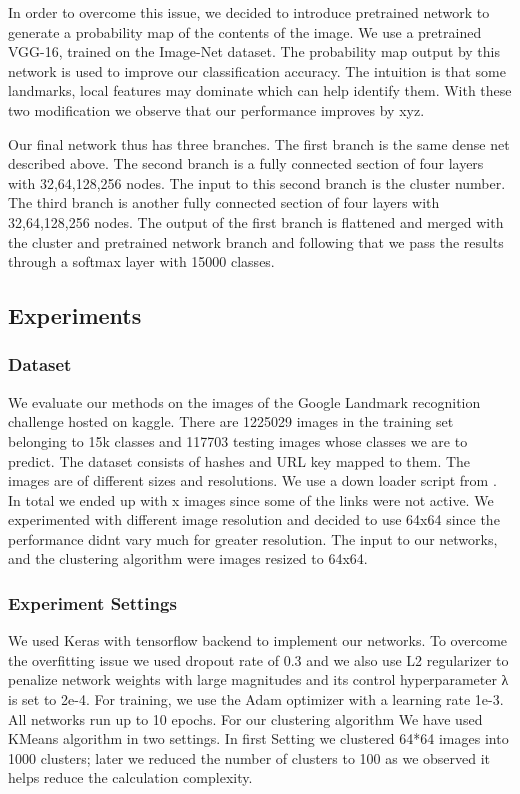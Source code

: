 \documentclass{article}
\begin{document}
In order to overcome this issue, we decided to introduce pretrained network to generate a probability map of the contents of the image. We use a pretrained VGG-16, trained on the Image-Net dataset. The probability map output by this network is used to improve our classification accuracy. The intuition is that some landmarks, local features may dominate which can help identify them. With these two modification we observe that our performance improves by xyz.

Our final network thus has three branches. The first branch is the same dense net described above. The second branch is a fully connected section of four layers with 32,64,128,256 nodes. The input to this second branch is the cluster number. The third branch is another fully connected section of four layers with 32,64,128,256 nodes. 
The output of the first branch is flattened and merged with the cluster and pretrained network branch and following that we pass the results through a softmax layer with 15000 classes.

\subsection{Experiments}

\subsubsection{Dataset}

We evaluate our methods on the images of the Google Landmark recognition challenge hosted on kaggle.{\cite{landmarkchallenge}}
There are 1225029 images in the training set belonging to 15k classes and 117703 testing images whose classes we are to predict. The dataset consists of hashes and URL key mapped to them. The images are of different sizes and resolutions. We use a down loader script from {\cite{source}}. In total we ended up with x images since some of the links were not active.
We experimented with different image resolution and decided to use 64x64 since the performance didnt vary much for greater resolution. The input to our networks, and the clustering algorithm were images resized to 64x64.



\subsubsection{Experiment Settings}
We used Keras {\cite{keras}} with tensorflow backend {\cite{tensorflow}}to implement our networks. To overcome the overfitting issue we used dropout rate of 0.3 and we also use L2 regularizer to penalize network
weights with large magnitudes and its control hyperparameter λ is set to
2e-4. For training, we use the Adam optimizer {\cite{adam}} with a learning rate 1e-3. All
networks run up to 10 epochs.
For our clustering algorithm We have used KMeans algorithm in two settings. In first Setting we clustered 64*64 images into 1000 clusters; later we reduced the number of clusters to 100 as we observed it helps reduce the calculation complexity.
\end{document}
